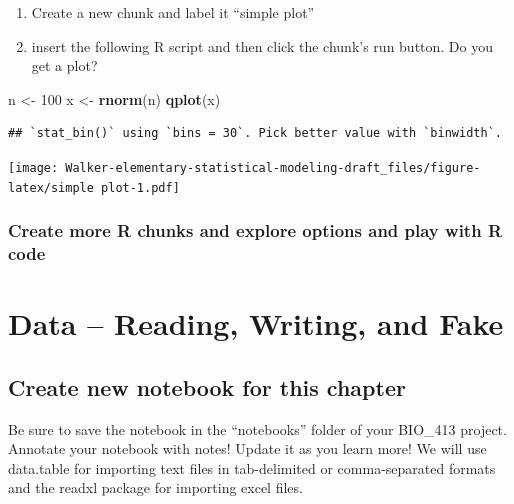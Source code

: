 \documentclass[]{book}
\newenvironment{Shaded}{\begin{snugshade}}{\end{snugshade}}
\newcommand{\KeywordTok}[1]{\textcolor[rgb]{0.13,0.29,0.53}{\textbf{#1}}}
\newcommand{\DataTypeTok}[1]{\textcolor[rgb]{0.13,0.29,0.53}{#1}}
\newcommand{\DecValTok}[1]{\textcolor[rgb]{0.00,0.00,0.81}{#1}}
\newcommand{\StringTok}[1]{\textcolor[rgb]{0.31,0.60,0.02}{#1}}
\newcommand{\OperatorTok}[1]{\textcolor[rgb]{0.81,0.36,0.00}{\textbf{#1}}}
\newcommand{\NormalTok}[1]{#1}
\providecommand{\tightlist}{%
  \setlength{\itemsep}{0pt}\setlength{\parskip}{0pt}}
\theoremstyle{definition}
\theoremstyle{definition}
\theoremstyle{definition}
\theoremstyle{remark}
\begin{document}
\begin{enumerate}
\def\labelenumi{\arabic{enumi}.}
\setcounter{enumi}{3}
\tightlist
\item
  Create a new chunk and label it ``simple plot''
\item
  insert the following R script and then click the chunk's run button.
  Do you get a plot?
\end{enumerate}

\begin{Shaded}
\begin{Highlighting}[]
\NormalTok{n <-}\StringTok{ }\DecValTok{100}
\NormalTok{x <-}\StringTok{ }\KeywordTok{rnorm}\NormalTok{(n)}
\KeywordTok{qplot}\NormalTok{(x)}
\end{Highlighting}
\end{Shaded}

\begin{verbatim}
## `stat_bin()` using `bins = 30`. Pick better value with `binwidth`.
\end{verbatim}

\texttt{[image: Walker-elementary-statistical-modeling-draft\_files/figure-latex/simple plot-1.pdf]}

\subsection{Create more R chunks and explore options and play with R
code}\label{create-more-r-chunks-and-explore-options-and-play-with-r-code}

\chapter{Data -- Reading, Writing, and
Fake}\label{data-reading-writing-and-fake}

\section{Create new notebook for this
chapter}\label{create-new-notebook-for-this-chapter}

Be sure to save the notebook in the ``notebooks'' folder of your
BIO\_413 project. Annotate your notebook with notes! Update it as you
learn more! We will use data.table for importing text files in
tab-delimited or comma-separated formats and the readxl package for
importing excel files.

\begin{Shaded}
\end{Shaded}
\end{document}
